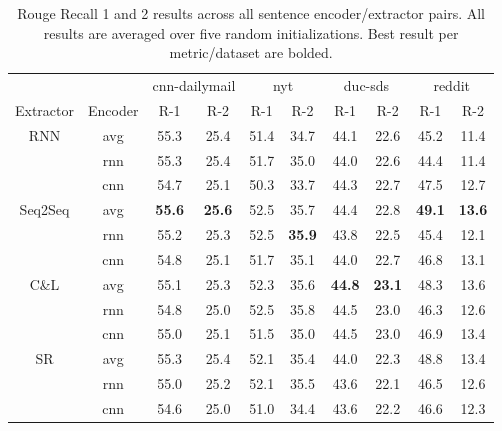 \begin{table*}
    \center
    \begin{tabular}{| c | c || c | c | c | c | c | c | c | c |}
        \hline
         &  & \multicolumn{2}{|c|}{cnn-dailymail} & \multicolumn{2}{|c|}{nyt} & \multicolumn{2}{|c|}{duc-sds} & \multicolumn{2}{|c|}{reddit}\\
        Extractor & Encoder & R-1 & R-2 & R-1 & R-2 & R-1 & R-2 & R-1 & R-2\\
        \hline
        \multirow{3}{*}{RNN} & avg & 55.3 & 25.4 & 51.4 & 34.7 & 44.1 & 22.6 & 45.2 & 11.4\\ \cline{2-10}
         & rnn & 55.3 & 25.4 & 51.7 & 35.0 & 44.0 & 22.6 & 44.4 & 11.4\\ \cline{2-10}
         & cnn & 54.7 & 25.1 & 50.3 & 33.7 & 44.3 & 22.7 & 47.5 & 12.7\\
        \hline
        \multirow{3}{*}{Seq2Seq} & avg & \textbf{55.6} & \textbf{25.6} & 52.5 & 35.7 & 44.4 & 22.8 & \textbf{49.1} & \textbf{13.6}\\ \cline{2-10}
                                 & rnn & 55.2 & 25.3 & 52.5 & \textbf{35.9} & 43.8 & 22.5 & 45.4 & 12.1\\ \cline{2-10}
         & cnn & 54.8 & 25.1 & 51.7 & 35.1 & 44.0 & 22.7 & 46.8 & 13.1\\
        \hline
        \multirow{3}{*}{C\&L} & avg & 55.1 & 25.3 & 52.3 & 35.6 & \textbf{44.8} & \textbf{23.1} & 48.3 & 13.6\\ \cline{2-10}
         & rnn & 54.8 & 25.0 & 52.5 & 35.8 & 44.5 & 23.0 & 46.3 & 12.6\\ \cline{2-10}
         & cnn & 55.0 & 25.1 & 51.5 & 35.0 & 44.5 & 23.0 & 46.9 & 13.4\\
        \hline
        \multirow{3}{*}{SR} & avg & 55.3 & 25.4 & 52.1 & 35.4 & 44.0 & 22.3 & 48.8 & 13.4\\ \cline{2-10}
         & rnn & 55.0 & 25.2 & 52.1 & 35.5 & 43.6 & 22.1 & 46.5 & 12.6\\ \cline{2-10}
         & cnn & 54.6 & 25.0 & 51.0 & 34.4 & 43.6 & 22.2 & 46.6 & 12.3\\
        \hline
    \end{tabular}
    \caption{Rouge Recall 1 and 2 results across all sentence encoder/extractor pairs. All results are averaged over five random initializations. Best result
    per metric/dataset are bolded.}
    \label{tab:results}
\end{table*}

